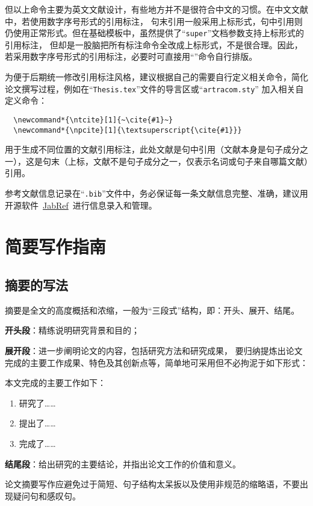 但以上命令主要为英文文献设计，有些地方并不是很符合中文的习惯。在中文文献中，若使用数字序号形式的引用标注，
句末引用一般采用上标形式，句中引用则仍使用正常形式。但在基础模板中，虽然提供了“\texttt{super}”文档参数支持上标形式的引用标注，
但却是一股脑把所有标注命令全改成上标形式，不是很合理。因此，若采用数字序号形式的引用标注，必要时可直接用“”命令自行排版。

为便于后期统一修改引用标注风格，建议根据自己的需要自行定义相关命令，简化论文撰写过程，例如在“\texttt{Thesis.tex}”文件的导言区或“\texttt{artracom.sty}”
加入相关自定义命令：{\linespread{1.1}
\begin{verbatim}
  \newcommand*{\ntcite}[1]{~\cite{#1}~}
  \newcommand*{\npcite}[1]{\textsuperscript{\cite{#1}}}
\end{verbatim}}
用于生成不同位置的文献引用标注，此处文献是句中引用（文献本身是句子成分之一），这是句末（上标，文献不是句子成分之一，仅表示名词或句子来自哪篇文献）引用。

参考文献信息记录在“\texttt{.bib}”文件中，务必保证每一条文献信息完整、准确，建议用开源软件~\href{https://www.jabref.org/}{JabRef}~进行信息录入和管理。

\section{简要写作指南}

\subsection{摘要的写法}

摘要是全文的高度概括和浓缩，一般为“三段式”结构，即：开头、展开、结尾。

\textbf{开头段}：精练说明研究背景和目的；

\textbf{展开段}：进一步阐明论文的内容，包括研究方法和研究成果，
要归纳提炼出论文完成的主要工作成果、特色及其创新点等，简单地可采用但不必拘泥于如下形式：

本文完成的主要工作如下：
\begin{enumerate}
\item 研究了……
\item 提出了……
\item 完成了……
\end{enumerate}

\textbf{结尾段}：给出研究的主要结论，并指出论文工作的价值和意义。

论文摘要写作应避免过于简短、句子结构太呆扳以及使用非规范的缩略语，不要出现疑问句和感叹句。

